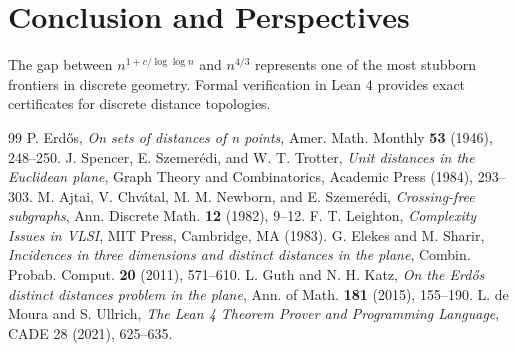 \documentclass[11pt,a4paper]{article}
\theoremstyle{definition}
\begin{document}
\section{Conclusion and Perspectives}
The gap between $n^{1 + c/\log \log n}$ and $n^{4/3}$ represents one of the most stubborn frontiers in discrete geometry. Formal verification in Lean 4 provides exact certificates for discrete distance topologies.

\begin{thebibliography}{99}
 P. Erd\H{o}s, \textit{On sets of distances of n points}, Amer. Math. Monthly \textbf{53} (1946), 248--250.
 J. Spencer, E. Szemer\'edi, and W. T. Trotter, \textit{Unit distances in the Euclidean plane}, Graph Theory and Combinatorics, Academic Press (1984), 293--303.
 M. Ajtai, V. Chv\'atal, M. M. Newborn, and E. Szemer\'edi, \textit{Crossing-free subgraphs}, Ann. Discrete Math. \textbf{12} (1982), 9--12.
 F. T. Leighton, \textit{Complexity Issues in VLSI}, MIT Press, Cambridge, MA (1983).
 G. Elekes and M. Sharir, \textit{Incidences in three dimensions and distinct distances in the plane}, Combin. Probab. Comput. \textbf{20} (2011), 571--610.
 L. Guth and N. H. Katz, \textit{On the Erd\H{o}s distinct distances problem in the plane}, Ann. of Math. \textbf{181} (2015), 155--190.
 L. de Moura and S. Ullrich, \textit{The Lean 4 Theorem Prover and Programming Language}, CADE 28 (2021), 625--635.
\end{thebibliography}
\end{document}
